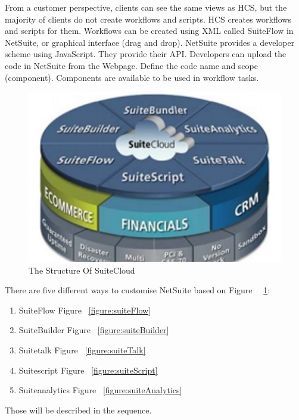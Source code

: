 From a customer perspective, clients can see the same views as HCS, but the majority of clients do not create workflows and scripts. HCS creates workflows and scripts for them.
Workflows can be created using XML called SuiteFlow in NetSuite, or graphical interface (drag and drop). NetSuite provides a developer scheme using JavaScript. They provide their API. Developers can upload the code in NetSuite from the Webpage. Define the code name and scope (component). Components are available to be used in workflow tasks.\par


\begin{figure}[!htb]
    \centering 
    \includegraphics[scale=0.7]{resource/StructureOfSuiteCloud.jpg}
    \caption{The Structure Of SuiteCloud}
    \label{figure:structureSuiteCloud}
\end{figure}




There are five different ways to customise NetSuite based on Figure ~~\ref{figure:structureSuiteCloud}:
\begin{enumerate}
\item SuiteFlow  Figure ~\ref{figure:suiteFlow}
\item SuiteBuilder  Figure ~\ref{figure:suiteBuilder}
\item Suitetalk Figure ~\ref{figure:suiteTalk}
\item Suitescript Figure ~\ref{figure:suiteScript}
\item Suiteanalytics Figure ~\ref{figure:suiteAnalytics}
\end{enumerate}

Those will be described in the sequence.

